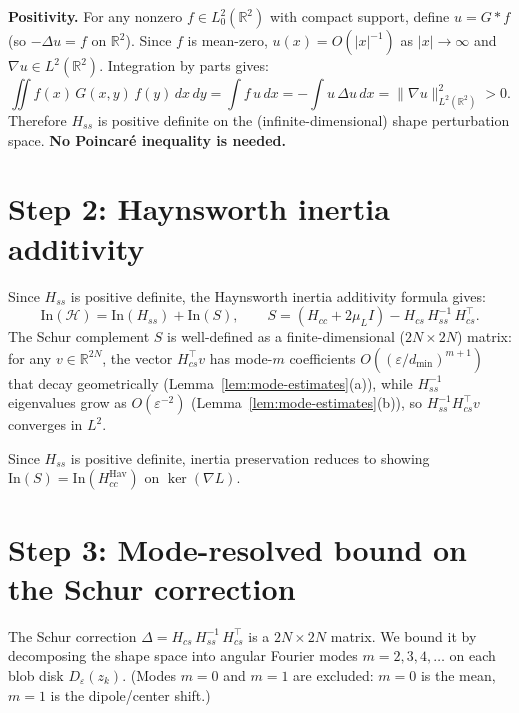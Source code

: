 \documentclass[11pt]{article}
\begin{document}
\textbf{Positivity.}
For any nonzero $f \in L^2_0(\mathbb{R}^2)$ with compact support,
define $u = G * f$ (so $-\Delta u = f$ on $\mathbb{R}^2$).
Since $f$ is mean-zero, $u(x) = O(|x|^{-1})$ as $|x| \to \infty$
and $\nabla u \in L^2(\mathbb{R}^2)$.  Integration by parts gives:
\[
  \iint f(x)\,G(x,y)\,f(y)\,dx\,dy
  = \int f\,u\,dx
  = -\int u\,\Delta u\,dx
  = \|\nabla u\|_{L^2(\mathbb{R}^2)}^2
  > 0.
\]
Therefore $H_{ss}$ is positive definite on the (infinite-dimensional)
shape perturbation space.  \textbf{No Poincar\'e inequality is needed.}

\section{Step 2: Haynsworth inertia additivity}

Since $H_{ss}$ is positive definite, the Haynsworth inertia additivity
formula \cite{Haynsworth1968} gives:
\[
  \mathrm{In}(\mathcal{H})
  = \mathrm{In}(H_{ss}) + \mathrm{In}(S),
  \qquad
  S = (H_{cc} + 2\mu_L I) - H_{cs}\,H_{ss}^{-1}\,H_{cs}^\top.
\]
The Schur complement $S$ is well-defined as a finite-dimensional
($2N \times 2N$) matrix: for any $v \in \mathbb{R}^{2N}$,
the vector $H_{cs}^\top v$ has mode-$m$ coefficients
$O((\varepsilon/d_{\min})^{m+1})$ that decay geometrically
(Lemma~\ref{lem:mode-estimates}(a)), while $H_{ss}^{-1}$
eigenvalues grow as $O(\varepsilon^{-2})$
(Lemma~\ref{lem:mode-estimates}(b)), so
$H_{ss}^{-1} H_{cs}^\top v$ converges in $L^2$.

Since $H_{ss}$ is positive definite,
inertia preservation reduces to showing
$\mathrm{In}(S) = \mathrm{In}(H_{cc}^{\mathrm{Hav}})$
on $\ker(\nabla L)$.

\section{Step 3: Mode-resolved bound on the Schur correction}

The Schur correction $\Delta = H_{cs}\,H_{ss}^{-1}\,H_{cs}^\top$
is a $2N \times 2N$ matrix.  We bound it by decomposing the shape
space into angular Fourier modes $m = 2, 3, 4, \ldots$ on each
blob disk $D_\varepsilon(z_k)$.  (Modes $m = 0$ and $m = 1$ are excluded:
$m = 0$ is the mean, $m = 1$ is the dipole/center shift.)
\end{document}
